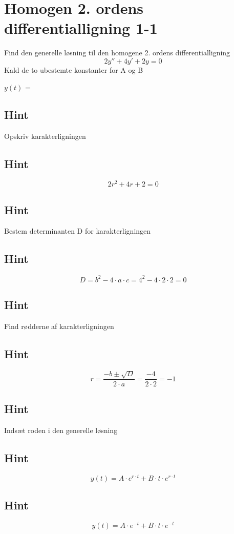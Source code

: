 \documentclass{article}
\newenvironment{exercise}[1]{\newpage\section{#1}}{}
\newcommand{\answerbox}[1]{\fbox{$#1$}}
\newcommand{\hint}{\subsection*{Hint}}
\begin{document}
\tableofcontents
\newpage


\begin{exercise}{Homogen 2. ordens differentialligning 1-1}

Find den generelle løsning til den homogene 2. ordens differentialligning
\[
2y'' + 4y' + 2y = 0
\]
Kald de to ubestemte konstanter for A og B

$y(t)$ = \answerbox{A \cdot e^{-t} + B \cdot t \cdot e^{-t}}


\hint 

Opskriv karakterligningen

\hint

\[
2 r^2 + 4r + 2 = 0
\]


\hint

Bestem determinanten D for karakterligningen


\hint 
\[
D = b^2 - 4 \cdot a \cdot c = 4^2 - 4 \cdot 2 \cdot 2  = 0
\]

\hint 
Find rødderne af karakterligningen


\hint

\[
r = \frac{-b \pm \sqrt{D}}{2 \cdot a} = \frac{-4}{2 \cdot 2} = -1
\]

\hint

Indsæt roden i den generelle løsning

\hint
\[
y(t) = A \cdot e^{r \cdot t} + B \cdot t \cdot e^{r \cdot t}
\]

\hint

\[
y(t) = A \cdot e^{-t} + B \cdot t \cdot e^{-t}
\]


\end{exercise}

\newpage
\end{document}
